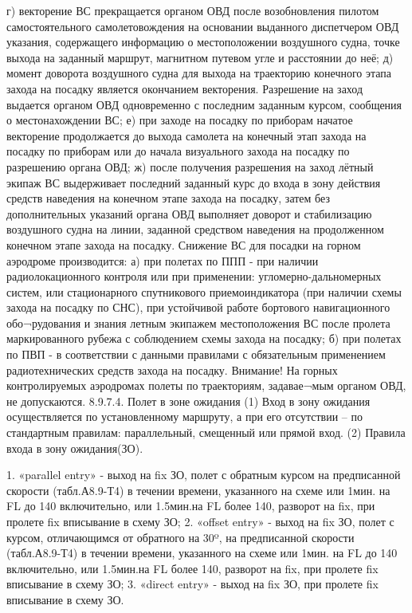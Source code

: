 г)	векторение ВС прекращается органом ОВД после возобновления пилотом самостоятельного самолетовождения на основании выданного диспетчером ОВД указания, содержащего информацию о местоположении воздушного судна, точке выхода на заданный маршрут, магнитном путевом угле и расстоянии до неё; 
д)	момент доворота воздушного судна для выхода на траекторию конечного этапа захода на посадку является окончанием векторения. Разрешение на заход выдается органом ОВД одновременно с последним заданным курсом, сообщения о местонахождении ВС; 
е)	при заходе на посадку по приборам начатое векторение продолжается до выхода самолета на конечный этап захода на посадку по приборам или до начала визуального захода на посадку по разрешению органа ОВД; 
ж)	после получения разрешения на заход лётный экипаж ВС выдерживает последний заданный курс до входа в зону действия средств наведения на конечном этапе захода на посадку, затем без дополнительных указаний органа ОВД выполняет доворот и стабилизацию воздушного судна на линии, заданной средством наведения на продолженном конечном этапе захода на посадку.
Снижение ВС для посадки на горном аэродроме производится:
а)	при полетах по ППП - при наличии радиолокационного контроля или при применении: угломерно-дальномерных систем, или стационарного спутникового приемоиндикатора (при наличии схемы захода на посадку по СНС), при устойчивой работе бортового навигационного обо¬рудования и знания летным экипажем местоположения ВС после пролета маркированного рубежа с соблюдением схемы захода на посадку;
б)	при полетах по ПВП - в соответствии с данными правилами с обязательным применением радиотехнических средств захода на посадку.
Внимание! На горных контролируемых аэродромах полеты по траекториям, задавае¬мым органом ОВД, не допускаются.
8.9.7.4.	Полет в зоне ожидания
(1) Вход в зону ожидания осуществляется по установленному маршруту, а при его отсутствии – по стандартным правилам: параллельный, смещенный или прямой вход.
(2) Правила входа в зону ожидания(ЗО).     
 
1. «parallel entry» - выход на fix ЗО, полет с обратным курсом на предписанной скорости (табл.А8.9-Т4) в течении времени, указанного на схеме или 1мин. на FL до 140 включительно, или 1.5мин.на FL более 140, разворот на fix, при пролете fix вписывание в схему ЗО;
2. «offset entry» - выход на fix ЗО, полет с курсом, отличающимся от обратного на 30º, на предписанной скорости (табл.А8.9-Т4) в течении времени, указанного на схеме или 1мин. на FL до 140 включительно, или 1.5мин.на FL более 140, разворот на fix, при пролете fix вписывание в схему ЗО;
3. «direct entry» - выход на fix ЗО, при пролете fix вписывание в схему ЗО.

